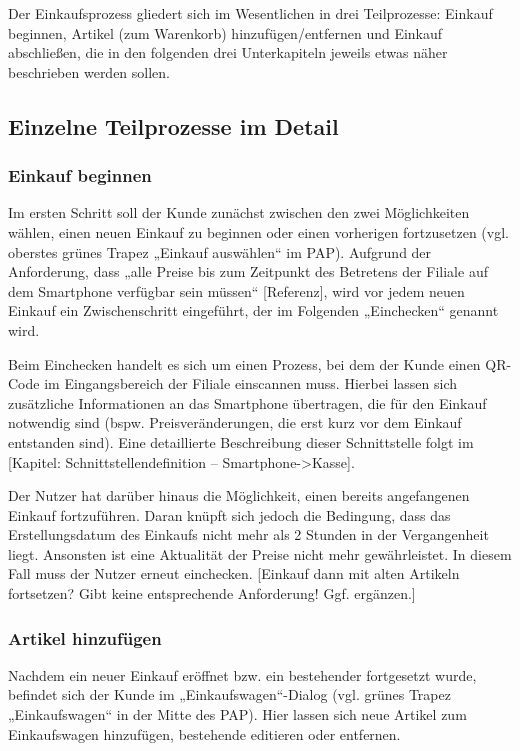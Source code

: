 Der Einkaufsprozess gliedert sich im Wesentlichen in drei Teilprozesse: Einkauf beginnen, Artikel (zum Warenkorb) hinzufügen/entfernen und Einkauf abschließen, die in den folgenden drei Unterkapiteln jeweils etwas näher beschrieben werden sollen.

\subsection{Einzelne Teilprozesse im Detail}

\subsubsection*{Einkauf beginnen}
Im ersten Schritt soll der Kunde zunächst zwischen den zwei Möglichkeiten wählen, einen neuen Einkauf zu beginnen oder einen vorherigen fortzusetzen (vgl. oberstes grünes Trapez „Einkauf auswählen“ im PAP). Aufgrund der Anforderung, dass „alle Preise bis zum Zeitpunkt des Betretens der Filiale auf dem Smartphone verfügbar sein müssen“ [Referenz], wird vor jedem neuen Einkauf ein  Zwischenschritt eingeführt, der im Folgenden „Einchecken“ genannt wird.

Beim Einchecken handelt es sich um einen Prozess, bei dem der Kunde einen QR-Code im Eingangsbereich der Filiale einscannen muss. Hierbei lassen sich zusätzliche Informationen an das Smartphone übertragen, die für den Einkauf notwendig sind (bspw. Preisveränderungen, die erst kurz vor dem Einkauf entstanden sind). Eine detaillierte Beschreibung dieser Schnittstelle folgt im [Kapitel: Schnittstellendefinition – Smartphone->Kasse].

Der Nutzer hat darüber hinaus die Möglichkeit, einen bereits angefangenen Einkauf fortzuführen. Daran knüpft sich jedoch die Bedingung, dass das Erstellungsdatum des Einkaufs nicht mehr als 2 Stunden in der Vergangenheit liegt. Ansonsten ist eine Aktualität der Preise nicht mehr gewährleistet. In diesem Fall muss der Nutzer erneut einchecken. [Einkauf dann mit alten Artikeln fortsetzen? Gibt keine entsprechende Anforderung! Ggf. ergänzen.]

\subsubsection*{Artikel hinzufügen}
Nachdem ein neuer Einkauf eröffnet bzw. ein bestehender fortgesetzt wurde, befindet sich der Kunde im „Einkaufswagen“-Dialog (vgl. grünes Trapez „Einkaufswagen“ in der Mitte des PAP). Hier lassen sich neue Artikel zum Einkaufswagen hinzufügen, bestehende editieren oder entfernen.

